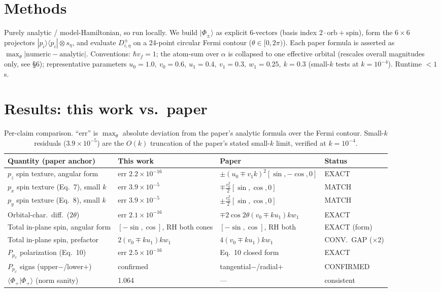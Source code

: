 \documentclass[11pt]{article}
\begin{document}
\section{Methods}
Purely analytic / model-Hamiltonian, so run locally. We build $|\Phi_\pm\rangle$ as explicit
6-vectors (basis index $2\cdot\text{orb}+\text{spin}$), form the $6\times6$ projectors
$|p_i\rangle\langle p_i|\otimes s_\eta$, and evaluate $D^{\pm}_{i,\eta}$ on a
24-point circular Fermi contour ($\theta\in[0,2\pi)$). Each paper formula is asserted as
$\max_\theta|\text{numeric}-\text{analytic}|$. Conventions: $\hbar v_f=1$; the atom-sum over
$\alpha$ is collapsed to one effective orbital (rescales overall magnitudes only, see \S6);
representative parameters $u_0{=}1.0,\ v_0{=}0.6,\ u_1{=}0.4,\ v_1{=}0.3,\ w_1{=}0.25,\ k{=}0.3$
(small-$k$ tests at $k{=}10^{-4}$). Runtime $<1$\,s.

\section{Results: this work vs.\ paper}
\begin{table}[h]
\centering
\begin{tabular}{@{}llll@{}}
\toprule
Quantity (paper anchor) & This work & Paper & Status \\
\midrule
$p_z$ spin texture, angular form & err $2.2\times10^{-16}$ & $\pm(u_0\mp v_1k)^2[\sin,-\cos,0]$ & EXACT \\
$p_x$ spin texture (Eq.~7), small $k$ & err $3.9\times10^{-5}$ & $\mp\tfrac{v_0^2}{2}[\sin,\cos,0]$ & MATCH \\
$p_y$ spin texture (Eq.~8), small $k$ & err $3.9\times10^{-5}$ & $\pm\tfrac{v_0^2}{2}[\sin,\cos,0]$ & MATCH \\
Orbital-char.\ diff.\ ($2\theta$) & err $2.1\times10^{-16}$ & $\mp2\cos2\theta(v_0\mp ku_1)kw_1$ & EXACT \\
Total in-plane spin, angular form & $[-\sin,\cos]$, RH both cones & $[-\sin,\cos]$, RH both & EXACT (form) \\
Total in-plane spin, prefactor & $2(v_0\mp ku_1)kw_1$ & $4(v_0\mp ku_1)kw_1$ & CONV.\ GAP ($\times2$) \\
$P_{p_x}$ polarization (Eq.~10) & err $2.5\times10^{-16}$ & Eq.~10 closed form & EXACT \\
$P_{p_x}$ signs (upper$-$/lower$+$) & confirmed & tangential$-$/radial$+$ & CONFIRMED \\
$\langle\Phi_+|\Phi_+\rangle$ (norm sanity) & 1.064 & --- & consistent \\
\bottomrule
\end{tabular}
\caption{Per-claim comparison. ``err'' is $\max_\theta$ absolute deviation from the paper's
analytic formula over the Fermi contour. Small-$k$ residuals ($3.9\times10^{-5}$) are the
$O(k)$ truncation of the paper's stated small-$k$ limit, verified at $k=10^{-4}$.}
\end{table}
\end{document}
